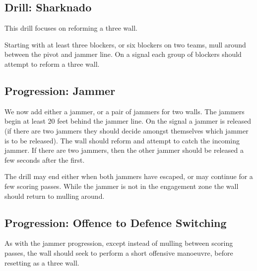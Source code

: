 \subsection*{Drill: Sharknado}
\label{drill:three_wall:reforming/sharknado}

This drill focuses on reforming a three wall.

Starting with at least three blockers, or six blockers on two teams, mull around between the pivot and jammer line. 
On a signal each group of blockers should attempt to reform a three wall.


\subsection*{Progression: Jammer}
\label{drill:three_wall:sharknado:jammer}


We now add either a jammer, or a pair of jammers for two walls.
The jammers begin at least 20 feet behind the jammer line.
On the signal a jammer is released (if there are two jammers they should decide amongst themselves which jammer is to be released).
The wall should reform and attempt to catch the incoming jammer.
If there are two jammers, then the other jammer should be released a few seconds after the first.  

The drill may end either when both jammers have escaped, or may continue for a few scoring passes.
While the jammer is not in the engagement zone the wall should return to mulling around.


\subsection*{Progression: Offence to Defence Switching}
\label{drill:three_wall:sharknado:o_to_d}

As with the jammer progression, except instead of mulling between scoring passes, the wall should seek to perform a short offensive manoeuvre, before resetting as a three wall.    
